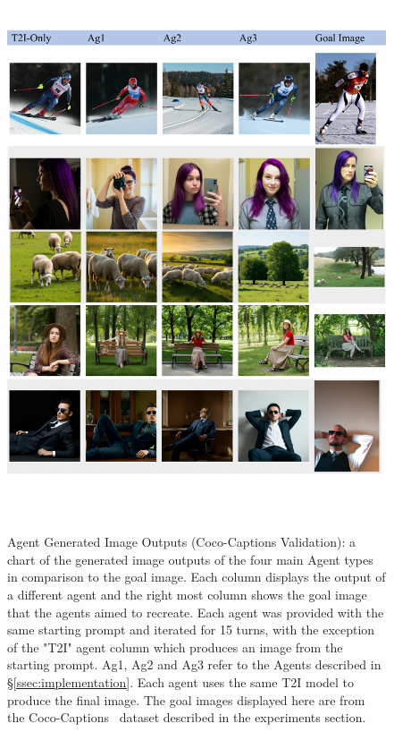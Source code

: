 \begin{figure}
    \centering
    \includegraphics[width=\linewidth]{figures/coco_data_chart_part1.pdf}
    \caption{Agent Generated Image Outputs (Coco-Captions Validation): a chart of the generated image outputs of the four main Agent types in comparison to the goal image. Each column displays the output of a different agent and the right most column shows the goal image that the agents aimed to recreate. Each agent was provided with the same starting prompt and iterated for 15 turns, with the exception of the "T2I" agent column which produces an image from the starting prompt. Ag1, Ag2 and Ag3 refer to the Agents described in \S\ref{ssec:implementation}. Each agent uses the same T2I model to produce the final image. The goal images displayed here are from the Coco-Captions~\cite{chen2015microsoft} dataset described in the experiments section.}
    \label{fig:coco1}
\end{figure}

